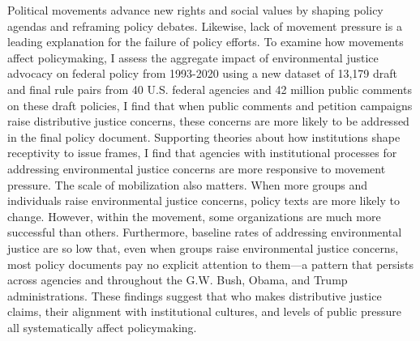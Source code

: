 Political movements advance new rights and social values by shaping policy agendas and reframing policy debates. Likewise, lack of movement pressure is a leading explanation for the failure of policy efforts. To examine how movements affect policymaking, I assess the aggregate impact of environmental justice advocacy on federal policy from 1993-2020 using a new dataset of 13,179 draft and final rule pairs from 40 U.S. federal agencies and 42 million public comments on these draft policies, I find that when public comments and petition campaigns raise distributive justice concerns, these concerns are more likely to be addressed in the final policy document. Supporting theories about how institutions shape receptivity to issue frames, I find that agencies with institutional processes for addressing environmental justice concerns are more responsive to movement pressure. The scale of mobilization also matters. When more groups and individuals raise environmental justice concerns, policy texts are more likely to change. However, within the movement, some organizations are much more successful than others. Furthermore, baseline rates of addressing environmental justice are so low that, even when groups raise environmental justice concerns, most policy documents pay no explicit attention to them---a pattern that persists across agencies and throughout the G.W. Bush, Obama, and Trump administrations. These findings suggest that who makes distributive justice claims, their alignment with institutional cultures, and levels of public pressure all systematically affect policymaking.
